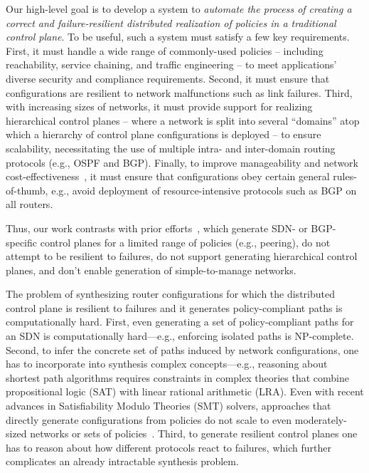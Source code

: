 Our high-level goal is to develop a system to {\em automate the
  process of creating a correct and failure-resilient distributed
  realization of policies in a traditional control plane}. To be
useful, such a system must satisfy a few key requirements. First, it
must handle a wide range of commonly-used policies -- including
reachability, service chaining, and traffic engineering -- to meet
applications' diverse security and compliance requirements. Second, it
must ensure that configurations are resilient to network malfunctions
such as link failures. Third, with increasing sizes of networks, it
must provide support for realizing hierarchical control planes --
where a network is split into several ``domains'' atop which a
hierarchy of control plane configurations is deployed -- to ensure
scalability, necessitating the use of multiple intra- and inter-domain
routing protocols (e.g., OSPF and BGP). Finally, to improve
manageability and network
cost-effectiveness~\cite{mpa:imc15,complexity:sigcomm11}, it must
ensure that configurations obey certain general rules-of-thumb, e.g.,
avoid deployment of resource-intensive protocols such as BGP on all
routers.


Thus, our work contrasts with prior efforts~\cite{netegg, propane,
  merlin, simple, fattire, netkat, netkatcompiler, sol}, which
generate SDN- or BGP-specific control planes for a limited range of
policies (e.g., peering), do not attempt to be resilient to failures,
do not support generating hierarchical control planes, and don't
enable generation of simple-to-manage networks.

The problem of synthesizing router configurations for which the
distributed control plane is resilient to failures and it generates
policy-compliant paths is computationally hard.  First, even
generating a set of policy-compliant paths for an SDN is
computationally hard---e.g., enforcing isolated paths is NP-complete.
Second, to infer the concrete set of paths induced by network
configurations, one has to incorporate into synthesis complex
concepts---e.g., reasoning about shortest path algorithms requires
constraints in complex theories that combine propositional logic (SAT)
with linear rational arithmetic (LRA). Even with recent advances in
Satisfiability Modulo Theories (SMT) solvers, approaches that directly
generate configurations from policies do not scale to even
moderately-sized networks or sets of policies~\cite{synet}.  Third, to
generate resilient control planes one has to reason about how
different protocols react to failures, which further complicates an
already intractable synthesis problem.


